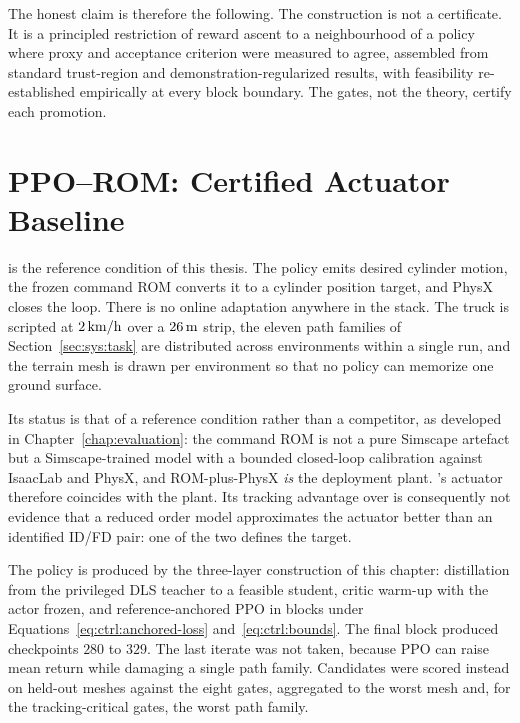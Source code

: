 The honest claim is therefore the following. The construction is not a
certificate. It is a principled restriction of reward ascent to a neighbourhood
of a policy where proxy and acceptance criterion were measured to agree,
assembled from standard trust-region and demonstration-regularized results,
with feasibility re-established empirically at every block boundary. The gates,
not the theory, certify each promotion.

\section{PPO--ROM: Certified Actuator Baseline}
\label{sec:ctrl:ppo-rom}

\ppoROM{} is the reference condition of this thesis. The policy emits desired
cylinder motion, the frozen command ROM converts it to a cylinder position
target, and PhysX closes the loop. There is no online adaptation anywhere in
the stack. The truck is scripted at $\unit[2]{km/h}$ over a $\unit[26]{m}$
strip, the eleven path families of Section~\ref{sec:sys:task} are distributed
across environments within a single run, and the terrain mesh is drawn per
environment so that no policy can memorize one ground surface.

Its status is that of a reference condition rather than a competitor, as
developed in Chapter~\ref{chap:evaluation}: the command ROM is not a pure
Simscape artefact but a Simscape-trained model with a bounded closed-loop
calibration against IsaacLab and PhysX, and ROM-plus-PhysX \emph{is} the
deployment plant. \ppoROM{}'s actuator therefore coincides with the plant. Its
tracking advantage over \ppoIDFD{} is consequently not evidence that a reduced
order model approximates the actuator better than an identified ID/FD pair: one of the two
defines the target.

The policy is produced by the three-layer construction of this chapter:
distillation from the privileged DLS teacher to a feasible student, critic
warm-up with the actor frozen, and reference-anchored PPO in blocks under
Equations~\eqref{eq:ctrl:anchored-loss} and~\eqref{eq:ctrl:bounds}. The final
block produced checkpoints $280$ to $329$. The last iterate was not taken,
because PPO can raise mean return while damaging a single path family.
Candidates were scored instead on held-out meshes against the eight gates,
aggregated to the worst mesh and, for the tracking-critical gates, the worst
path family.


